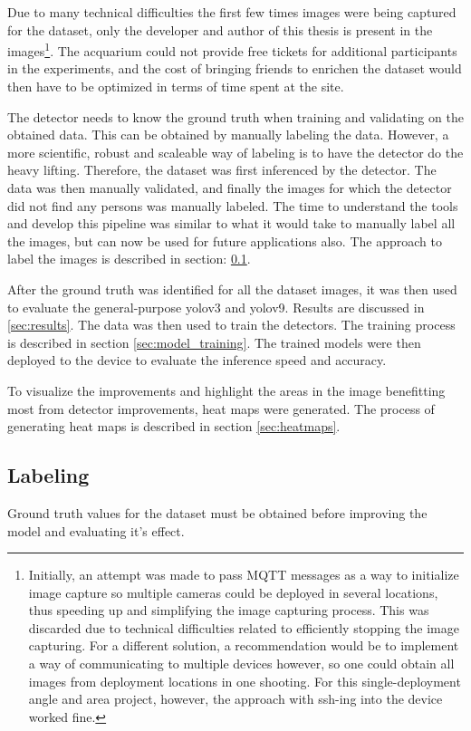 Due to many technical difficulties the first few times images were being captured for the dataset, only the developer and author of this thesis is present in the images\footnote{Initially, an attempt was made to pass MQTT messages as a way to initialize image capture so multiple cameras could be deployed in several locations, thus speeding up and simplifying the image capturing process. This was discarded due to technical difficulties related to efficiently stopping the image capturing. For a different solution, a recommendation would be to implement a way of communicating to multiple devices however, so one could obtain all images from deployment locations in one shooting. For this single-deployment angle and area project, however, the approach with ssh-ing into the device worked fine.}. The acquarium could not provide free tickets for additional participants in the experiments, and the cost of bringing friends to enrichen the dataset would then have to be optimized in terms of time spent at the site.

The detector needs to know the ground truth when training and validating on the obtained data. This can be obtained by manually labeling the data. However, a more scientific, robust and scaleable way of labeling is to have the detector do the heavy lifting. Therefore, the dataset was first inferenced by the detector. The data was then manually validated, and finally the images for which the detector did not find any persons was manually labeled. The time to understand the tools and develop this pipeline was similar to what it would take to manually label all the images, but can now be used for future applications also. The approach to label the images is described in section: \ref{sec:labeling}.

After the ground truth was identified for all the dataset images, it was then used to evaluate the general-purpose yolov3 and yolov9. Results are discussed in \ref{sec:results}. The data was then used to train the detectors. The training process is described in section \ref{sec:model_training}. The trained models were then deployed to the device to evaluate the inference speed and accuracy.

To visualize the improvements and highlight the areas in the image benefitting most from detector improvements, heat maps were generated. The process of generating heat maps is described in section \ref{sec:heatmaps}.

\subsection{Labeling}
\label{sec:labeling}
Ground truth values for the dataset must be obtained before improving the model and evaluating it's effect. 

